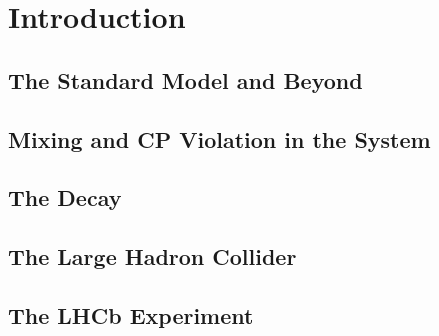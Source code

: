 \chapter{Introduction}

\section{The Standard Model and Beyond}
\section{Mixing and CP Violation in the \BsBsbar{} System}
\cite{Dighe:1998vk,Dunietz:2000cr}
\section{The \BstoJpsiphi{} Decay}
\section{The Large Hadron Collider}
\section{The LHCb Experiment}

